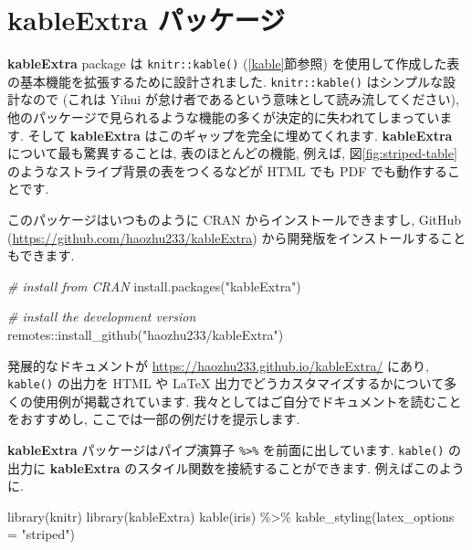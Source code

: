 \documentclass[
  11pt,
]{bxjsreport}
\newenvironment{Shaded}{\begin{snugshade}}{\end{snugshade}}
\newcommand{\AttributeTok}[1]{\textcolor[rgb]{0.77,0.63,0.00}{#1}}
\newcommand{\CommentTok}[1]{\textcolor[rgb]{0.56,0.35,0.01}{\textit{#1}}}
\newcommand{\FunctionTok}[1]{\textcolor[rgb]{0.00,0.00,0.00}{#1}}
\newcommand{\NormalTok}[1]{#1}
\newcommand{\SpecialCharTok}[1]{\textcolor[rgb]{0.00,0.00,0.00}{#1}}
\newcommand{\StringTok}[1]{\textcolor[rgb]{0.31,0.60,0.02}{#1}}
\begin{document}
\hypertarget{kableextra}{%
\section{\texorpdfstring{\textbf{kableExtra} パッケージ}{kableExtra パッケージ}}\label{kableextra}}

\textbf{kableExtra} package \autocite{R-kableExtra}は \texttt{knitr::kable()} (\ref{kable}節参照) を使用して作成した表の基本機能を拡張するために設計されました. \texttt{knitr::kable()} はシンプルな設計なので (これは Yihui が怠け者であるという意味として読み流してください), 他のパッケージで見られるような機能の多くが決定的に失われてしまっています. そして \textbf{kableExtra} はこのギャップを完全に埋めてくれます. \textbf{kableExtra} について最も驚異することは, 表のほとんどの機能, 例えば, 図\ref{fig:striped-table}のようなストライプ背景の表をつくるなどが HTML でも PDF でも動作することです.

このパッケージはいつものように CRAN からインストールできますし, GitHub (\url{https://github.com/haozhu233/kableExtra}) から開発版をインストールすることもできます.

\begin{Shaded}
\begin{Highlighting}[numbers=left,,]
\CommentTok{\# install from CRAN}
\FunctionTok{install.packages}\NormalTok{(}\StringTok{"kableExtra"}\NormalTok{)}

\CommentTok{\# install the development version}
\NormalTok{remotes}\SpecialCharTok{::}\FunctionTok{install\_github}\NormalTok{(}\StringTok{"haozhu233/kableExtra"}\NormalTok{)}
\end{Highlighting}
\end{Shaded}

発展的なドキュメントが \url{https://haozhu233.github.io/kableExtra/} にあり, \texttt{kable()} の出力を HTML や LaTeX 出力でどうカスタマイズするかについて多くの使用例が掲載されています. 我々としてはご自分でドキュメントを読むことをおすすめし, ここでは一部の例だけを提示します.

\textbf{kableExtra} パッケージはパイプ演算子 \texttt{\%\textgreater{}\%} を前面に出しています. \texttt{kable()} の出力に \textbf{kableExtra} のスタイル関数を接続することができます. 例えばこのように.

\begin{Shaded}
\begin{Highlighting}[numbers=left,,]
\FunctionTok{library}\NormalTok{(knitr)}
\FunctionTok{library}\NormalTok{(kableExtra)}
\FunctionTok{kable}\NormalTok{(iris) }\SpecialCharTok{\%\textgreater{}\%}
  \FunctionTok{kable\_styling}\NormalTok{(}\AttributeTok{latex\_options =} \StringTok{"striped"}\NormalTok{)}
\end{Highlighting}
\end{Shaded}
\end{document}
